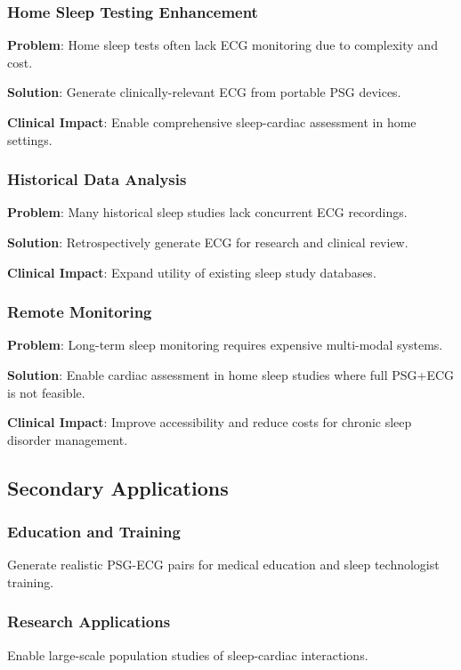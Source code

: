 \documentclass[11pt,en]{elegantpaper}
\begin{document}
\subsubsection{Home Sleep Testing Enhancement}
\textbf{Problem}: Home sleep tests often lack ECG monitoring due to complexity and cost.

\textbf{Solution}: Generate clinically-relevant ECG from portable PSG devices.

\textbf{Clinical Impact}: Enable comprehensive sleep-cardiac assessment in home settings.

\subsubsection{Historical Data Analysis}
\textbf{Problem}: Many historical sleep studies lack concurrent ECG recordings.

\textbf{Solution}: Retrospectively generate ECG for research and clinical review.

\textbf{Clinical Impact}: Expand utility of existing sleep study databases.

\subsubsection{Remote Monitoring}
\textbf{Problem}: Long-term sleep monitoring requires expensive multi-modal systems.

\textbf{Solution}: Enable cardiac assessment in home sleep studies where full PSG+ECG is not feasible.

\textbf{Clinical Impact}: Improve accessibility and reduce costs for chronic sleep disorder management.

\subsection{Secondary Applications}

\subsubsection{Education and Training}
Generate realistic PSG-ECG pairs for medical education and sleep technologist training.

\subsubsection{Research Applications}
Enable large-scale population studies of sleep-cardiac interactions.
\end{document}
